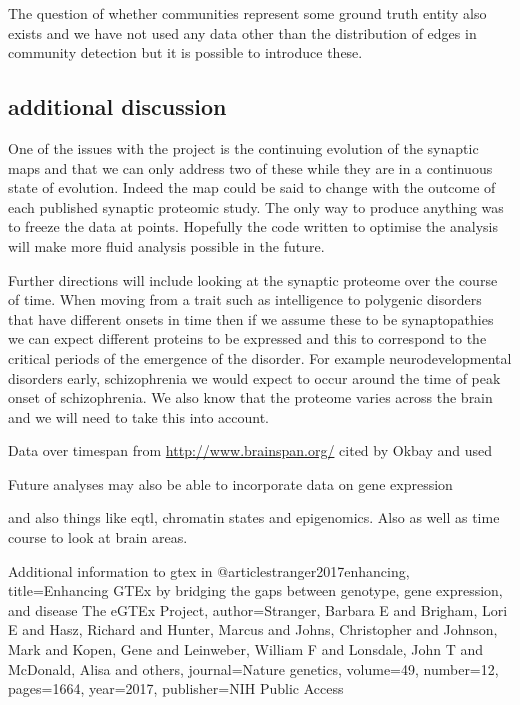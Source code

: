 The question of whether communities represent some ground truth entity also exists \cite{peel2017ground}  and we have not used any data other than the distribution of edges in community detection but it is possible to introduce these.  \cite{newman2016structure} 



\subsection{additional discussion}

One of the issues with the project is the continuing evolution of the synaptic maps and that we can only address two of these while they are in a continuous state of evolution. Indeed the map could be said to change with the outcome of each published synaptic proteomic study. The only way to produce anything was to freeze the data at points. Hopefully the code written to optimise the analysis will make more fluid analysis possible in the future.

Further directions will include looking at the synaptic proteome over the course of time. When moving from a trait such as intelligence to polygenic disorders that have different onsets in time then if we assume these to be synaptopathies we can expect different proteins to be expressed and this to correspond to the critical periods of the emergence of the disorder. For example neurodevelopmental disorders early, schizophrenia we would expect to occur around the time of peak onset of schizophrenia. We also know that the proteome varies across the brain and we will need to take this into account.

Data over timespan from \url{http://www.brainspan.org/} cited by Okbay and used 

Future analyses may also be able to incorporate data on gene expression

and also things like eqtl, chromatin states and epigenomics. Also as well as time course to look at brain areas. 

Additional information to gtex in
@article{stranger2017enhancing,
  title={Enhancing GTEx by bridging the gaps between genotype, gene expression, and disease The eGTEx Project},
  author={Stranger, Barbara E and Brigham, Lori E and Hasz, Richard and Hunter, Marcus and Johns, Christopher and Johnson, Mark and Kopen, Gene and Leinweber, William F and Lonsdale, John T and McDonald, Alisa and others},
  journal={Nature genetics},
  volume={49},
  number={12},
  pages={1664},
  year={2017},
  publisher={NIH Public Access}
}

